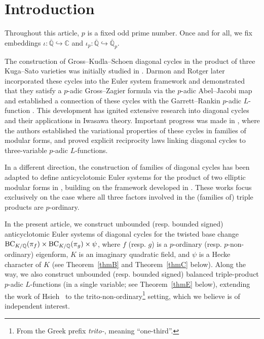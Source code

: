 \documentclass{amsart}
\numberwithin{equation}{section}
\newcommand{\bb}{\mathbb}
\newcommand{\QQ}{\mathbb{Q}}
\begin{document}
\maketitle


\tableofcontents

\section{Introduction}
Throughout this article, $p$ is a fixed odd prime number. Once and for all, we fix embeddings $\iota:\overline{\bb{Q}}\hookrightarrow \bb{C}$ and $\iota_p:\overline{\bb{Q}}\hookrightarrow \overline{\bb{Q}}_p$.

The construction of Gross--Kudla--Schoen diagonal cycles in the product of three Kuga--Sato varieties was initially studied in \cite{GrossSchoen-cycle,grosskudla}. Darmon and Rotger later incorporated these cycles into the Euler system framework and demonstrated that they satisfy a $p$-adic Gross--Zagier formula via the $p$-adic Abel--Jacobi map and established a connection of these cycles with the Garrett--Rankin $p$-adic $L$-function \cite{darmonrotger14,darmonrotger17}. This development has ignited extensive research into diagonal cycles and their applications in Iwasawa theory. Important progress was made in \cite{asterisque}, where the authors established the variational properties of these cycles in families of modular forms, and proved explicit reciprocity laws linking diagonal cycles to three-variable $p$-adic $L$-functions.


In a different direction, the construction of families of diagonal cycles has been adapted to define anticyclotomic Euler systems for the product of two elliptic modular forms in \cite{ACR25,ACR}, building on the framework developed in \cite{JNS}. These works focus exclusively on the case where all three factors involved in the (families of) triple products are $p$-ordinary.


In the present article, we construct unbounded (resp. bounded signed) anticyclotomic Euler systems of diagonal cycles for the twisted base change ${\rm BC}_{K/\QQ}(\pi_f)\times {\rm BC}_{K/\QQ}(\pi_g)\times \psi$, where $f$ (resp. $g$) is a $p$-ordinary (resp. $p$-non-ordinary) eigenform, $K$ is an imaginary quadratic field, and $\psi$ is a Hecke character of $K$ (see Theorem~\ref{thmB} and Theorem~\ref{thmC} below).  Along the way, we also construct unbounded (resp. bounded signed) balanced triple-product $p$-adic $L$-functions (in a single variable; see Theorem~\ref{thmE} below), extending the work of Hsieh~\cite{hsiehpadicbalanced} to the trito-non-ordinary\footnote{From the Greek prefix \textit{trito-}, meaning ``one-third''.} setting, which we believe is of independent interest.
\end{document}
